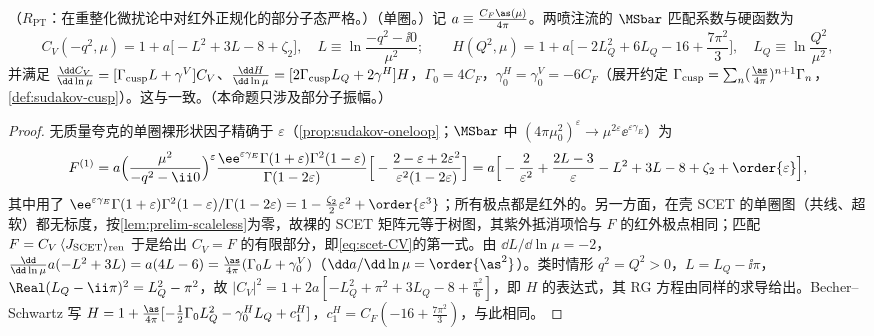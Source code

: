 \begin{proposition}\label{prop:scet-hard-matching}
（$R_{\mathrm{PT}}$：在重整化微扰论中对红外正规化的部分子态严格。）（单圈。）记 $a\equiv\frac{C_F\as(\mu)}{4\pi}$。两喷注流的 $\MSbar$ 匹配系数与硬函数为
\begin{equation}\label{eq:scet-CV}
C_V(-q^2,\mu)=1+a\big[-L^2+3L-8+\zeta_2\big],\quad L\equiv\ln\frac{-q^2-\ii0}{\mu^2};\qquad
H(Q^2,\mu)=1+a\Big[-2L_Q^2+6L_Q-16+\frac{7\pi^2}{3}\Big],\quad L_Q\equiv\ln\frac{Q^2}{\mu^2},
\end{equation}
并满足 $\frac{\dd C_V}{\dd\ln\mu}=[\Gamma_{\rm cusp}L+\gamma^V]C_V$、$\frac{\dd H}{\dd\ln\mu}=[2\Gamma_{\rm cusp}L_Q+2\gamma^H]H$，$\Gamma_0=4C_F$，$\gamma^H_0=\gamma^V_0=-6C_F$（展开约定 $\Gamma_{\rm cusp}=\sum_n(\frac{\as}{4\pi})^{n+1}\Gamma_n$，\cref{def:sudakov-cusp}）。这与\cite[附录~B]{BecherSchwartz2008}一致。（本命题只涉及部分子振幅。）
\end{proposition}

\begin{proof}
无质量夸克的单圈裸形状因子精确于 $\varepsilon$（\cref{prop:sudakov-oneloop}；$\MSbar$ 中 $(4\pi\mu_0^2)^\varepsilon\to\mu^{2\varepsilon}\ee^{\varepsilon\gamma_E}$）为
\[
F^{(1)}=a\Big(\frac{\mu^2}{-q^2-\ii0}\Big)^{\varepsilon}\frac{\ee^{\varepsilon\gamma_E}\Gamma(1+\varepsilon)\Gamma^2(1-\varepsilon)}{\Gamma(1-2\varepsilon)}\Big[-\frac{2-\varepsilon+2\varepsilon^2}{\varepsilon^2(1-2\varepsilon)}\Big]
=a\Big[-\frac{2}{\varepsilon^2}+\frac{2L-3}{\varepsilon}-L^2+3L-8+\zeta_2+\order{\varepsilon}\Big],
\]
其中用了 $\ee^{\varepsilon\gamma_E}\Gamma(1+\varepsilon)\Gamma^2(1-\varepsilon)/\Gamma(1-2\varepsilon)=1-\frac{\zeta_2}{2}\varepsilon^2+\order{\varepsilon^3}$；所有极点都是红外的。另一方面，在壳 SCET 的单圈图（共线、超软）都无标度，按\cref{lem:prelim-scaleless}为零，故裸的 SCET 矩阵元等于树图，其紫外抵消项恰与 $F$ 的红外极点相同；匹配 $F=C_V\,\langle J_{\rm SCET}\rangle_{\rm ren}$ 于是给出 $C_V=F$ 的有限部分，即\cref{eq:scet-CV}的第一式。由 $\dd L/\dd\ln\mu=-2$，$\frac{\dd}{\dd\ln\mu}a(-L^2+3L)=a(4L-6)=\frac{\as}{4\pi}(\Gamma_0L+\gamma^V_0)$（$\dd a/\dd\ln\mu=\order{\as^2}$）。类时情形 $q^2=Q^2>0$，$L=L_Q-\ii\pi$，$\Real(L_Q-\ii\pi)^2=L_Q^2-\pi^2$，故 $|C_V|^2=1+2a[-L_Q^2+\pi^2+3L_Q-8+\frac{\pi^2}{6}]$，即 $H$ 的表达式，其 RG 方程由同样的求导给出。Becher--Schwartz 写 $H=1+\frac{\as}{4\pi}[-\frac12\Gamma_0L_Q^2-\gamma^H_0L_Q+c^H_1]$，$c^H_1=C_F(-16+\frac{7\pi^2}{3})$，与此相同。
\end{proof}

